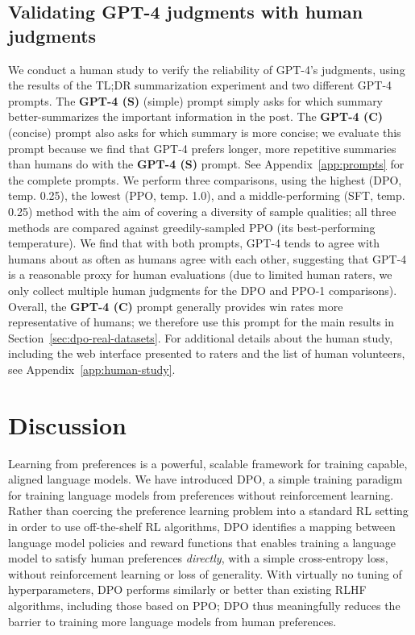 \subsection{Validating GPT-4 judgments with human judgments}
\label{sec:human-judgments}
We conduct a human study to verify the reliability of GPT-4's judgments, using the results of the TL;DR summarization experiment and two different GPT-4 prompts. The \textbf{GPT-4 (S)} (simple) prompt simply asks for which summary better-summarizes the important information in the post. The \textbf{GPT-4 (C)} (concise) prompt also asks for which summary is more concise; we evaluate this prompt because we find that GPT-4 prefers longer, more repetitive summaries than humans do with the \textbf{GPT-4 (S)} prompt. See Appendix~\ref{app:prompts} for the complete prompts. We perform three comparisons, using the highest (DPO, temp. 0.25), the lowest (PPO, temp. 1.0), and a middle-performing (SFT, temp. 0.25) method with the aim of covering a diversity of sample qualities; all three methods are compared against greedily-sampled PPO (its best-performing temperature). We find that with both prompts, GPT-4 tends to agree with humans about as often as humans agree with each other, suggesting that GPT-4 is a reasonable proxy for human evaluations (due to limited human raters, we only collect multiple human judgments for the DPO and PPO-1 comparisons). Overall, the \textbf{GPT-4 (C)} prompt generally provides win rates more representative of humans; we therefore use this prompt for the main results in Section~\ref{sec:dpo-real-datasets}. For additional details about the human study, including the web interface presented to raters and the list of human volunteers, see Appendix~\ref{app:human-study}.

\section{Discussion}
Learning from preferences is a powerful, scalable framework for training capable, aligned language models. We have introduced DPO, a simple training paradigm for training language models from preferences without reinforcement learning. Rather than coercing the preference learning problem into a standard RL setting in order to use off-the-shelf RL algorithms, DPO identifies a mapping between language model policies and reward functions that enables training a language model to satisfy human preferences \textit{directly}, with a simple cross-entropy loss, without reinforcement learning or loss of generality. With virtually no tuning of hyperparameters, DPO performs similarly or better than existing RLHF algorithms, including those based on PPO; DPO thus meaningfully reduces the barrier to training more language models from human preferences.

